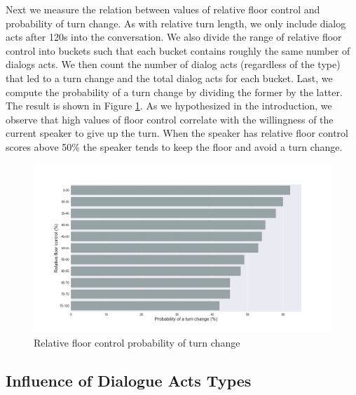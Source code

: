 Next we measure the relation between values of relative floor control and probability of turn change.
As with relative turn length, we only include dialog acts after 120s into the conversation. We also divide the range of relative floor control into buckets such that each bucket contains roughly the same number of dialogs acts. We then count the number of dialog acts (regardless of the type) that led to a turn change and the total dialog acts for each bucket. Last, we compute the probability of a turn change by dividing the former by the latter.
The result is shown in Figure \ref {fig:rfc:turn}.  As we hypothesized in the introduction, we observe that high values of floor control correlate with the willingness of the current speaker to give up the turn. When the speaker has relative floor control scores above 50\% the speaker tends to keep the floor and avoid a turn change.
%
\begin{figure}[ht!]
\centering
\includegraphics[width=\textwidth]{../scikitlearn/figures/f6.png}\vspace{-1em}
\caption{Relative floor control probability of turn change}
\label{fig:rfc:turn}
\end{figure}



\subsection{Influence of Dialogue Acts Types}


